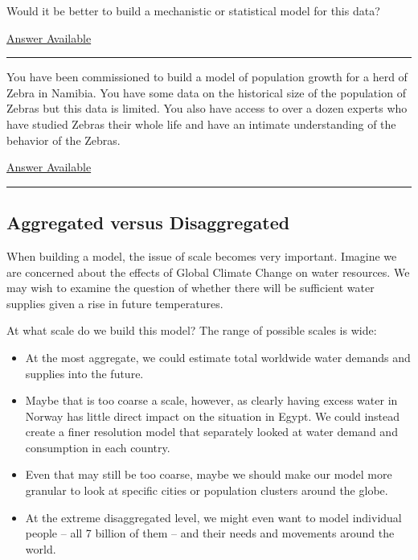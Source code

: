 \documentclass[]{memoir}
\begin{document}
Would it be better to build a mechanistic or statistical model for this
data?

\hyperref[Ans-7-1]{Answer Available}

\begin{center}\rule{3in}{0.4pt}\end{center}


You have been commissioned to build a model of population growth for a
herd of Zebra in Namibia. You have some data on the historical size of
the population of Zebras but this data is limited. You also have access
to over a dozen experts who have studied Zebras their whole life and
have an intimate understanding of the behavior of the Zebras.

\hyperref[Ans-7-2]{Answer Available}

\begin{center}\rule{3in}{0.4pt}\end{center}

\subsection{Aggregated versus Disaggregated}

When building a model, the issue of scale becomes very important.
Imagine we are concerned about the effects of Global Climate Change on
water resources. We may wish to examine the question of whether there
will be sufficient water supplies given a rise in future temperatures.

At what scale do we build this model? The range of possible scales is
wide:

\begin{itemize}
\itemsep1pt\parskip0pt
\item
  At the most aggregate, we could estimate total worldwide water demands
  and supplies into the future.
\item
  Maybe that is too coarse a scale, however, as clearly having excess
  water in Norway has little direct impact on the situation in Egypt. We
  could instead create a finer resolution model that separately looked
  at water demand and consumption in each country.
\item
  Even that may still be too coarse, maybe we should make our model more
  granular to look at specific cities or population clusters around the
  globe.
\item
  At the extreme disaggregated level, we might even want to model
  individual people -- all 7 billion of them -- and their needs and
  movements around the world.
\end{itemize}
\end{document}
